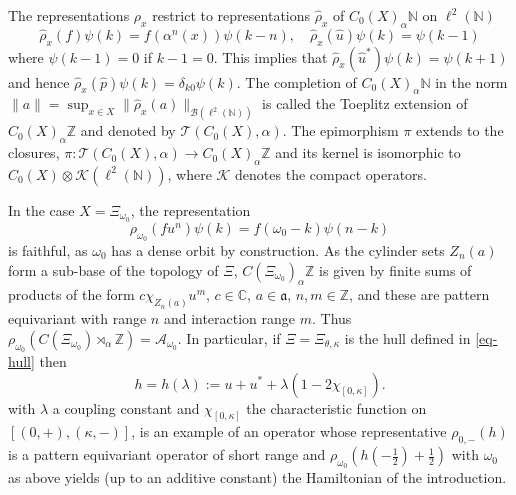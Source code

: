 \documentclass[11pt]{amsart}
\newcommand{\Z}{\mathbb{Z}}
\newcommand{\N}{\mathbb{N}}
\newcommand{\C}{\mathbb{C}}
\newcommand{\cut}{\kappa}
\begin{document}
The representations $\rho_x$ restrict to 
representations $\hat\rho_x$ of $C_0(X)_\alpha \N$ on $\ell^2(\N)$
$$\hat\rho_{x}(f)\psi(k) = f(\alpha^n(x)) \psi(k-n), \quad \hat\rho_{x}(\hat u)\psi(k) = \psi(k-1)$$
where $\psi(k-1)=0$ if $k-1=0$. This implies that $\hat\rho_{x}(\hat u^*)\psi(k) = \psi(k+1)$ and hence $\hat\rho_{x}(\hat p)\psi(k) = \delta_{k0} \psi(k)$. %
The completion of  $C_0(X)_\alpha \N$ in the norm
$\lVert a \rVert=\sup_{x\in X}\lVert \hat\rho_{x}(a) \rVert_{\mathcal{B}(\ell^2(\N))}$ is called the Toeplitz extension of $C_0(X)_\alpha \Z$
and denoted by $\mathcal T(C_0(X),\alpha)$. The epimorphism $\pi$ extends to the closures, $\pi:\mathcal T(C_0(X),\alpha)\to C_0(X)_\alpha \Z$ and its kernel is isomorphic to $C_0(X)\otimes\mathcal K(\ell^2(\N))$,
where $\mathcal K$ denotes the compact operators. 

In the case $X=\Xi_{\omega_0}$, the representation$$\rho_{\omega_0}(f u^n)\psi(k) = f (\omega_0-k)\psi(n-k)$$
is faithful, as $\omega_0$ has a dense orbit by construction.
As the cylinder sets $Z_n(a)$ %
form a sub-base of the topology of $\Xi$, 
$C(\Xi_{\omega_0})_\alpha\Z$ is given by finite sums of products of the form $c\chi_{Z_n(a)}u^m$, $c\in\C$, $a\in\mathfrak a$, $n,m\in\Z$, and these are pattern equivariant with range $n$ and interaction range $m$. Thus $\rho_{\omega_0}(C(\Xi_{\omega_0})\rtimes_\alpha\Z)=\mathcal A_{\omega_0}$.
In particular, if $\Xi = \Xi_{\theta,\cut}$ is the hull defined in \eqref{eq-hull} then 
\begin{equation}
	\label{our_model}
	h = h(\lambda) := u+u^*+\lambda(1-2\chi_{[0, \cut]}).
\end{equation}
with $\lambda$ a coupling constant and 
$\chi_{[0, \cut]}$ the characteristic function on 
$[(0,+),(\cut,-)]$, is an example of an operator whose representative $\rho_{0,-}(h)$ is a pattern equivariant operator of short range and $\rho_{\omega_0}(h(-\frac12)+\frac12)$ with $\omega_0$ as above yields (up to an additive constant) the Hamiltonian of the introduction.
\end{document}
